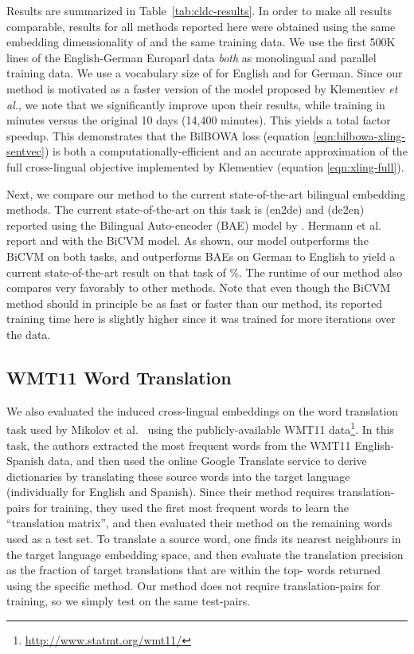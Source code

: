 \documentclass[10pt]{article}
\begin{document}
Results are summarized in Table~\ref{tab:cldc-results}. In order to make all
results comparable, results for all methods reported here were obtained using
the same embedding dimensionality of  and the same training data.  We use
the first 500K lines of the English-German Europarl data \emph{both} as
monolingual and parallel training data. We use a vocabulary size of 
for English and  for German. Since our method is motivated as a faster
version of the model proposed by Klementiev \emph{et al.}, we note that we 
significantly improve upon their results, while
training in  minutes versus the original 10 days (14,400 minutes). This yields a
total factor  speedup. This demonstrates that the BilBOWA loss 
(equation \ref{eqn:bilbowa-xling-sentvec}) is both a
computationally-efficient and an accurate approximation of the full cross-lingual
objective implemented by Klementiev (equation \ref{eqn:xling-full}).

Next, we compare our method to the current state-of-the-art bilingual embedding
methods.  The current state-of-the-art on this task is  (en2de) and
 (de2en) reported using the Bilingual Auto-encoder (BAE) model by
\cite{chandar2014autoencoder}. Hermann et al.~\cite{hermann2013multilingual}
report  and  with the BiCVM model. As shown, our model outperforms
the BiCVM on both tasks, and outperforms BAEs on German to English to yield a
current state-of-the-art result on that task of \%. The runtime of our
method also compares very favorably to other methods. Note that even though the
BiCVM method should in principle be as fast or faster than our method, its
reported training time here is slightly higher since it was trained for more iterations
over the data.

\subsection{WMT11 Word Translation}
\label{sec:wmt}

We also evaluated the induced cross-lingual embeddings on the word
translation task used by Mikolov et al.~\cite{mikolov2013exploiting} using the
publicly-available WMT11 data\footnote{\url{http://www.statmt.org/wmt11/}}. 
In this task, the authors extracted the  most frequent words from the WMT11
English-Spanish data, and then used the online Google Translate service to
derive dictionaries by translating these source words into the target language
(individually for English and Spanish).  Since their method requires
translation-pairs for training, they used the first  most frequent words to
learn the ``translation matrix'', and then evaluated their method on the
remaining  words used as a test set. To translate a source word, one finds
its  nearest neighbours in the target language embedding space, and then
evaluate the translation precision  as the fraction of target translations
that are within the top- words returned using the specific method.  Our
method does not require translation-pairs for training, so we simply test on
the same  test-pairs.
\end{document}
